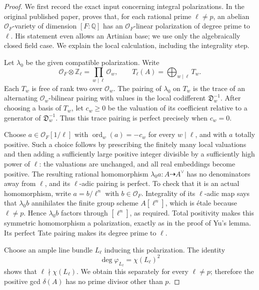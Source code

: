 \begin{proof}
We first record the exact input concerning integral
polarizations. In the original published paper,
\citet[Lemma 2.7, pp.~2117--2118]{frC4Yu2003HB}
proves that, for each rational prime \(\ell\ne p\), an abelian
\(\mathcal O_F\)-variety of dimension \([F:\mathbb Q]\) has an
\(\mathcal O_F\)-linear polarization of degree prime to \(\ell\).
His statement even allows an Artinian base; we use only the
algebraically closed field case. We explain the local
calculation, including the integrality step.

Let \(\lambda_0\) be the given compatible polarization. Write
\[
 \mathcal O_F\otimes\mathbb Z_\ell=\prod_{w\mid\ell}\mathcal O_w,
       \qquad T_\ell(A)=\bigoplus_{w\mid\ell}T_w .
\]
Each \(T_w\) is free of rank two over \(\mathcal O_w\).
The pairing of \(\lambda_0\) on \(T_w\) is the trace of an
alternating \(\mathcal O_w\)-bilinear pairing with values in
the local codifferent \(\mathfrak D_w^{-1}\).
After choosing a basis of \(T_w\), let \(c_w\ge0\) be the
valuation of its coefficient relative to a generator of
\(\mathfrak D_w^{-1}\). Thus this trace pairing is perfect
precisely when \(c_w=0\).

Choose \(a\in\mathcal O_F[1/\ell]\) with
\(\operatorname{ord}_w(a)=-c_w\) for every \(w\mid\ell\),
and with \(a\) totally positive. Such a choice follows
by prescribing the finitely many local valuations and
then adding a sufficiently large positive integer divisible
by a sufficiently high power of \(\ell\): the valuations
are unchanged, and all real embeddings become positive.
The resulting rational homomorphism
\(\lambda_0a:A\dashrightarrow A^\vee\) has no denominators
away from \(\ell\), and its \(\ell\)-adic pairing is perfect.
To check that it is an actual homomorphism, write
\(a=b/\ell^n\) with \(b\in\mathcal O_F\).
Integrality of its \(\ell\)-adic map says that \(\lambda_0b\)
annihilates the finite group scheme \(A[\ell^n]\), which is
étale because \(\ell\ne p\). Hence \(\lambda_0b\) factors
through \([\ell^n]\), as required. Total positivity makes
this symmetric homomorphism a polarization, exactly as
in the proof of Yu's lemma. Its perfect Tate pairing
makes its degree prime to \(\ell\).

Choose an ample line bundle \(L_\ell\) inducing this
polarization. The identity
\[
                   \deg\varphi_{L_\ell}=\chi(L_\ell)^2
\]
shows that \(\ell\nmid\chi(L_\ell)\).
We obtain this separately for every \(\ell\ne p\);
therefore the positive gcd \(\delta(A)\) has no prime
divisor other than \(p\).


\end{proof}
